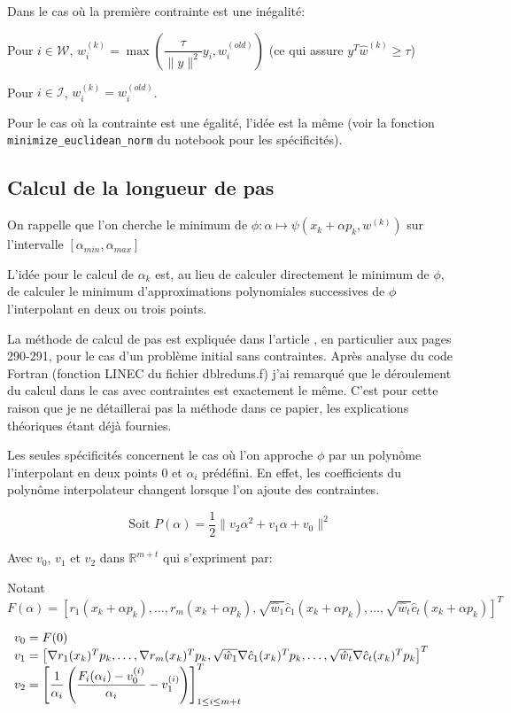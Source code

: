 \documentclass[a4paper,11pt]{article}
\newcommand{\hc}{\hat{c}}
\numberwithin{equation}{section}
\begin{document}
 
Dans le cas où la première contrainte est une inégalité: 

Pour $i \in \mathcal{W}$, $w_{i}^{(k)} = \max(\dfrac{\tau}{\|y\|^{2}}y_{i}, w_{i}^{(old)})$ (ce qui assure $y^{T}\hat{w}^{(k)} \geq \tau$)

Pour $i \in \mathcal{I}$, $w_{i}^{(k)} = w_{i}^{(old)}$.


Pour le cas où la contrainte est une égalité, l'idée est la même (voir la fonction \texttt{minimize\_euclidean\_norm} du notebook pour les spécificités).

\subsection{Calcul de la longueur de pas}

On rappelle que l'on cherche le minimum de $\phi: \alpha \mapsto \psi(x_{k}+\alpha p_{k},w^{(k)})$ sur l'intervalle $[\alpha_{min},\alpha_{max}]$

L'idée pour le calcul de $\alpha_{k}$ est, au lieu de calculer directement le minimum de $\phi$, de calculer le minimum d'approximations polynomiales successives de $\phi$ l'interpolant en deux ou trois points. 

La méthode de calcul de pas est expliquée dans l'article \cite{lindstromwedin1984}, en particulier aux pages 290-291, pour le cas d'un problème initial sans contraintes. Après analyse du code Fortran (fonction LINEC du fichier dblreduns.f) j'ai remarqué que le déroulement du calcul dans le cas avec contraintes est exactement le même. C'est pour cette raison que je ne détaillerai pas la méthode dans ce papier, les explications théoriques étant déjà fournies.


Les seules spécificités concernent le cas où l'on approche $\phi$ par un polynôme l'interpolant en deux points $0$ et $\alpha_{i}$ prédéfini. En effet, les coefficients du polynôme interpolateur changent lorsque l'on ajoute des contraintes.

$$\text{Soit }P(\alpha) = \dfrac{1}{2}\|v_2\alpha^2 + v_1\alpha + v_0\|^2$$

Avec $v_0$, $v_1$ et $v_2$ dans $\mathbb{R}^{m+t}$ qui s'expriment par: 

Notant $F(\alpha) = \left[r_1(x_{k}+\alpha p_{k}), \ldots, r_m(x_{k}+\alpha p_{k}), \sqrt{\hat{w}_1}\hc_1(x_{k}+\alpha p_{k}), \ldots, \sqrt{\hat{w}_t}\hc_t(x_{k}+\alpha p_{k})\right]^{T}$

$\begin{array}{l l l}
v_0 = F(0) \\
v_1 = \left[\nabla r_1(x_{k})^Tp_{k},\ldots, \nabla r_m(x_{k})^Tp_{k}, \sqrt{\hat{w}_1}\nabla \hc_1(x_{k})^Tp_{k}, \ldots, \sqrt{\hat{w}_t}\nabla \hc_t(x_{k})^Tp_{k} \right]^T \\
v_2 = \left[ \dfrac{1}{\alpha_i}\left( \dfrac{F_i(\alpha_i) - v_0^{(i)}}{\alpha_i} - v_1^{(i)}\right)\right]_{1 \leq i \leq m+t}^T
\end{array}$
\end{document}
